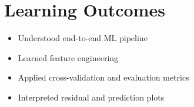 \documentclass[12pt]{article}
\begin{document}
\section*{Learning Outcomes}
\begin{itemize}
  \item Understood end-to-end ML pipeline
  \item Learned feature engineering
  \item Applied cross-validation and evaluation metrics
  \item Interpreted residual and prediction plots
\end{itemize}
\end{document}
